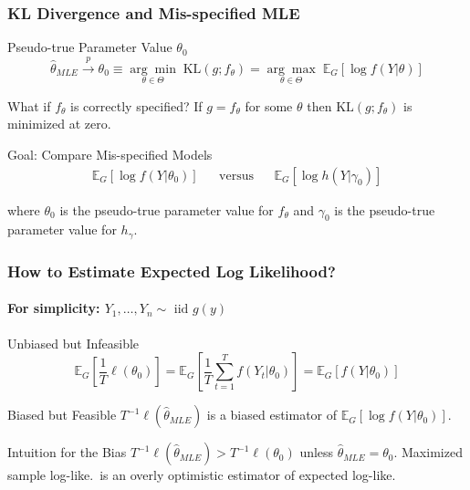 \begin{frame}
  \frametitle{KL Divergence and Mis-specified MLE}

  \begin{block}{Pseudo-true Parameter Value $\theta_0$}
    \vspace{-1em}
  \[
    \widehat{\theta}_{MLE} \overset{p}{\rightarrow} \theta_0 \equiv \underset{\theta \in \Theta}{\arg \min} \; \text{KL}(g;f_\theta) = \underset{\theta \in \Theta}{\arg \max} \; \mathbb{E}_G[\log f(Y|\theta)] 
  \]
\end{block}


\pause

\begin{block}{What if $f_\theta$ is correctly specified?}
  If $g = f_\theta$ for some $\theta$ then $\text{KL}(g;f_\theta)$ is minimized at zero.
\end{block}

\pause

\begin{alertblock}{Goal: Compare Mis-specified Models}
  \vspace{-2.5em}
  \begin{align*}
    \mathbb{E}_G \left[ \log f(Y|\theta_0) \right] && \mbox{versus} && 
    \mathbb{E}_G \left[ \log h(Y|\gamma_0) \right]
  \end{align*}
  \vspace{-2em}

 where $\theta_0$ is the pseudo-true parameter value for $f_\theta$ and $\gamma_0$ is the pseudo-true parameter value for $h_\gamma$.
  
\end{alertblock}

\end{frame}
\begin{frame}
  \frametitle{How to Estimate Expected Log Likelihood?}
  \framesubtitle{For simplicity: $Y_1, \dots, Y_n \sim \mbox{ iid } g(y)$}


  \begin{block}{Unbiased but Infeasible}
    \[
      \mathbb{E}_G \left[\frac{1}{T}\ell(\theta_0)\right] = \mathbb{E}_G\left[ \frac{1}{T} \sum_{t=1}^T f(Y_t|\theta_0)\right] = \mathbb{E}_G\left[ f(Y|\theta_0) \right]
    \]
    
  \end{block}
   
  \pause

  \vspace{-1em}

  \begin{block}{Biased but Feasible}
    $T^{-1}\ell(\widehat{\theta}_{MLE})$ is a \alert{biased} estimator of $\mathbb{E}_G[\log f(Y|\theta_0)]$. 
  \end{block}

  \pause

  \begin{block}{Intuition for the Bias}
    $T^{-1}\ell(\widehat{\theta}_{MLE}) > T^{-1}\ell(\theta_0)$ unless $\widehat{\theta}_{MLE} = \theta_0$. 
    Maximized sample log-like.\ is an \alert{overly optimistic} estimator of expected log-like.
  \end{block}

\end{frame}
